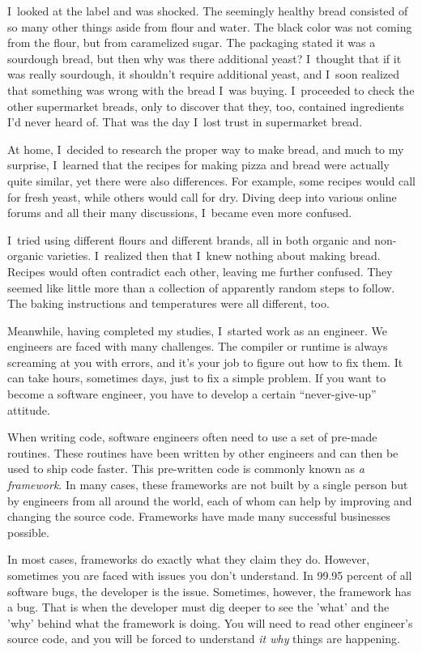 I~looked at the label and was shocked. The seemingly
healthy bread consisted of so many other things aside from flour and water.
The black color was not coming from the flour, but from caramelized sugar.
The packaging stated it was a sourdough bread, but then why was there additional yeast?
I~thought that if it was really sourdough, it shouldn't require additional yeast, and I~soon 
realized that something was wrong with the bread I~was buying.
I~proceeded to check the other supermarket breads, only to discover that they, too,
contained ingredients I'd never heard of. That was the day I~lost trust
in supermarket bread.

At home, I~decided to research the proper way to make bread, and much to my surprise,
I~learned that the recipes for making pizza and bread were actually quite similar, yet
there were also differences. For example, some recipes would call for fresh yeast, while
others would call for dry. Diving deep into various online forums and all their many
discussions, I~became even more confused.

I~tried using different flours and different brands, all in both organic and non-organic varieties.
I~realized then that I~knew nothing about making bread. Recipes would often contradict each other,
leaving me further confused. They seemed like little more than a collection of apparently random
steps to follow. The baking instructions and temperatures were all different, too.

Meanwhile, having completed my studies, I~started work as an engineer.
We engineers are faced with many challenges. The compiler or runtime is
always screaming at you with errors, and it's your job to figure out how to fix them.
It can take hours, sometimes days, just to fix a simple problem. If you want
to become a software engineer, you have to develop a certain ``never-give-up'' attitude.

When writing code, software engineers often need to use a set of pre-made routines. These routines have been
written by other engineers and can then be used to ship code faster.
This pre-written code is commonly known as \emph{a framework}. In many cases,
these frameworks are not built by a single person but by engineers from all around the world,
each of whom can help by improving and changing the source code. Frameworks have made many successful
businesses possible.

In most cases, frameworks do exactly what they claim they do. However,
sometimes you are faced with issues you don't understand. In 99.95 percent
of all software bugs, the developer is the issue. Sometimes, however, the framework has a
bug. That is when the developer must dig deeper to see the 'what' and the 'why' behind what
the framework is doing. You will need to read other engineer's source code, and you will be forced
to understand \emph{it why} things are happening.

